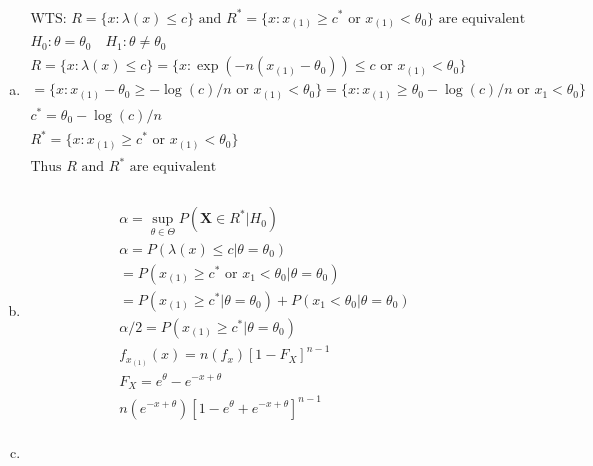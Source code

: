 \documentclass{article}
\newcommand{\ta}{\theta}
\newcommand{\lx}{\lambda(x)}
\begin{document}
\begin{flushleft}
\begin{enumerate}[(a)]
	\item 
\begin{multline*}\\
\text{WTS: } R=\{x:\lx \leq c \}\text{ and }R^*=\{x:x_{(1)}\geq c^* \text{ or } x_{(1)}<\ta_0 \} \text{ are equivalent}\\
H_0:\ta=\ta_0 \quad H_1:\ta\neq \ta_0\\
R=\{x:\lx \leq c \}=\{x:\exp(-n(x_{(1)}-\ta_0))\leq c \text{ or } x_{(1)}<\ta_0 \}\\
=\{x:x_{(1)}-\ta_0 \geq -\log(c)/n  \text{ or } x_{(1)}<\ta_0\}=\{x:x_{(1)} \geq \ta_0-\log(c)/n  \text{ or } x_{1}<\ta_0\}\\
c^*=\ta_0-\log(c)/n\\
R^*=\{x:x_{(1)}\geq c^* \text{ or } x_{(1)}<\ta_0 \}\\
\text{Thus }R \text{ and } R^* \text{ are equivalent}\\
\end{multline*}

	\item 
\begin{multline*}\\
\alpha=\sup_{\ta \in \Theta}P(\bm{X}\in R^*|H_0)\\
\alpha=P(\lx\leq c|\ta=\ta_0)\\
=P(x_{(1)}\geq c^*  \text{ or } x_{1}<\ta_0|\ta=\ta_0)\\
=P(x_{(1)}\geq c^*|\ta=\ta_0)+P(x_{1}<\ta_0|\ta=\ta_0)\\
\alpha/2=P(x_{(1)}\geq c^*|\ta=\ta_0)\\
f_{x_{(1)}}(x)=n(f_x)[1-F_X]^{n-1}\\
F_X=e^\ta-e^{-x+\ta}\\
n(e^{-x+\ta})[1-e^\ta+e^{-x+\ta}]^{n-1}\\
\end{multline*}

	\item 
\begin{multline*}\\
\end{multline*}
	
\end{enumerate}

\end{flushleft}
\end{document}
